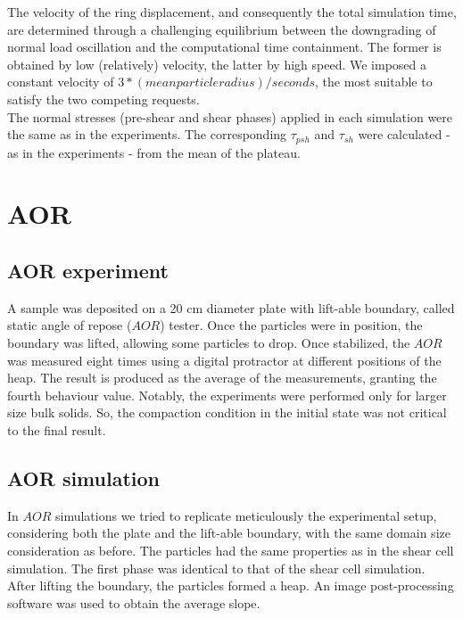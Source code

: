 \begin{appendix}
The velocity of the ring displacement, and consequently the total simulation time, are determined 
through a challenging equilibrium between the downgrading of normal load oscillation and the computational time containment. 
The former is obtained by low (relatively) velocity, the latter by high speed. We imposed a constant velocity 
of $3*(mean particle radius)/seconds$, the most suitable to satisfy the two competing requests. \\
The normal stresses (pre-shear and shear phases) applied in each simulation were the same as in the experiments. 
The corresponding $\tau_{psh}$ and $\tau_{sh}$ were calculated - as in the experiments - from the mean of the plateau.\\
% 

\section{AOR}
\label{sec:AOR}

\subsection{AOR experiment}
\label{subsec:aorexperiment}
A sample was deposited on a 20 cm diameter plate with lift-able boundary, called
static angle of repose ($AOR$) tester. %
% 
Once the particles were in position, the boundary was lifted, allowing some particles to drop. 
Once stabilized, the $AOR$ was measured eight times using a digital protractor at different positions of the heap. 
The result is produced as the average of the measurements, granting the fourth
behaviour value.
Notably, the experiments were performed only for larger size bulk solids. 
So, the compaction condition in the initial state was not critical to the final result.
%


\subsection{AOR simulation}
\label{subsec:aorsimulation}
In $AOR$ simulations we tried to replicate meticulously the experimental setup, 
considering both the plate and the lift-able boundary, with the same domain size consideration as before. 
The particles had the same properties as in the shear cell simulation. The first phase was identical to that of the shear cell simulation. 
After lifting the boundary, the particles formed a heap.
%  
An image post-processing software was used to obtain the average slope.
% 




\end{appendix}